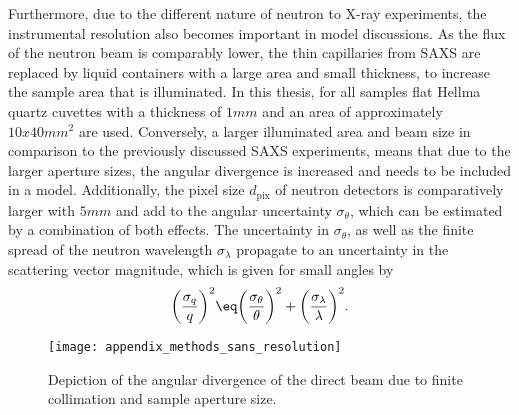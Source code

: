 \documentclass[\main/dresen_thesis.tex]{subfiles}
\begin{document}
    Furthermore, due to the different nature of neutron to X-ray experiments, the instrumental resolution also becomes important in model discussions.
    As the flux of the neutron beam is comparably lower, the thin capillaries from SAXS are replaced by liquid containers with a large area and small thickness, to increase the sample area that is illuminated.
    In this thesis, for all samples flat Hellma quartz cuvettes with a thickness of $1 \unit{mm}$ and an area of approximately  $10x40 \unit{mm^2}$ are used.
    Conversely, a larger illuminated area and beam size in comparison to the previously discussed SAXS experiments, means that due to the larger aperture sizes, the angular divergence is increased and needs to be included in a model.
    Additionally, the pixel size $d_\mathrm{pix}$ of neutron detectors is comparatively larger with $5 \unit{mm}$ and add to the angular uncertainty $\sigma_\theta$, which can be estimated by a combination of both effects.
    The uncertainty in $\sigma_\theta$, as well as the finite spread of the neutron wavelength $\sigma_\lambda$ propagate to an uncertainty in the scattering vector magnitude, which is given for small angles by
    \begin{align}
      \biggl( \frac{\sigma_q}{q} \biggr)^2 \eq \biggl( \frac{\sigma_\theta}{\theta} \biggr)^2 + \biggl(\frac{\sigma_\lambda}{\lambda}\biggr)^2.
    \end{align}

    \begin{figure}[tb]
      \centering
      \texttt{[image: appendix\_methods\_sans\_resolution]}
      \caption{\label{fig:methods:sans:resolution}Depiction of the angular divergence of the direct beam due to finite collimation and sample aperture size.}
    \end{figure}
\end{document}
